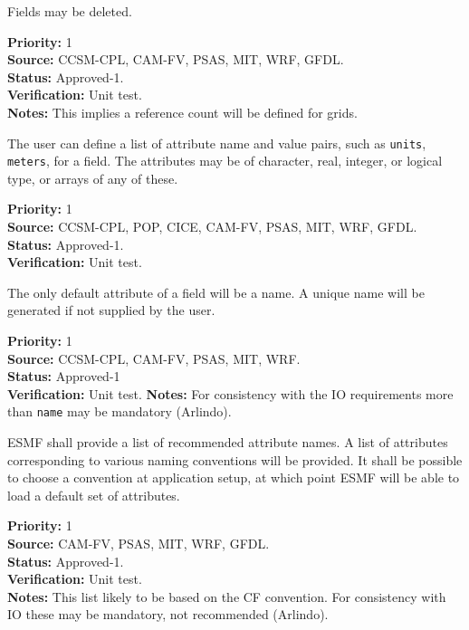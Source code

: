 Fields may be deleted.
\begin{reqlist} 
{\bf Priority:} 1 \\
{\bf Source:} CCSM-CPL, CAM-FV, PSAS, MIT, WRF, GFDL. \\
{\bf Status:} Approved-1. \\
{\bf Verification:} Unit test. \\
{\bf Notes:} This implies a reference count will be defined for grids.
\end{reqlist}

The user can define a list of attribute name and value pairs, such 
as {\tt units}, {\tt meters}, for a field.  
The attributes may be of character, real, integer, or logical type,
or arrays of any of these.
\begin{reqlist}
{\bf Priority:} 1 \\
{\bf Source:} CCSM-CPL, POP, CICE, CAM-FV, PSAS, MIT, WRF, GFDL. \\
{\bf Status:} Approved-1. \\
{\bf Verification:} Unit test. 
\end{reqlist}

The only default attribute of a field will be a name. A unique name will be
generated if not supplied by the user.
\begin{reqlist}
{\bf Priority:} 1 \\
{\bf Source:} CCSM-CPL, CAM-FV, PSAS, MIT, WRF. \\
{\bf Status:} Approved-1 \\
{\bf Verification:} Unit test. 
{\bf Notes:} For consistency with the IO requirements more than {\tt name} may be mandatory (Arlindo).
\end{reqlist}

ESMF shall provide a list of recommended attribute names. A list of
attributes corresponding to various naming conventions will be
provided. It shall be possible to choose a convention at application
setup, at which point ESMF will be able to load a default set of
attributes.

\begin{reqlist}
{\bf Priority:} 1 \\
{\bf Source:} CAM-FV, PSAS, MIT, WRF, GFDL. \\
{\bf Status:} Approved-1. \\
{\bf Verification:} Unit test. \\
{\bf Notes:} This list likely to be based on the CF convention. For
consistency with IO these may be mandatory, not recommended (Arlindo).
\end{reqlist}

